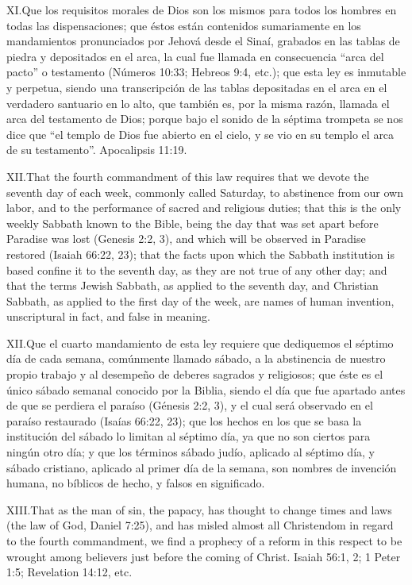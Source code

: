 \lettrine{XI.} Que los requisitos morales de Dios son los mismos para todos los hombres en todas las dispensaciones; que éstos están contenidos sumariamente en los mandamientos pronunciados por Jehová desde el Sinaí, grabados en las tablas de piedra y depositados en el arca, la cual fue llamada en consecuencia “arca del pacto” o testamento (Números 10:33; Hebreos 9:4, etc.); que esta ley es inmutable y perpetua, siendo una transcripción de las tablas depositadas en el arca en el verdadero santuario en lo alto, que también es, por la misma razón, llamada el arca del testamento de Dios; porque bajo el sonido de la séptima trompeta se nos dice que “el templo de Dios fue abierto en el cielo, y se vio en su templo el arca de su testamento”. Apocalipsis 11:19.


\lettrine{XII.} That the fourth commandment of this law requires that we devote the seventh day of each week, commonly called Saturday, to abstinence from our own labor, and to the performance of sacred and religious duties; that this is the only weekly Sabbath known to the Bible, being the day that was set apart before Paradise was lost (Genesis 2:2, 3), and which will be observed in Paradise restored (Isaiah 66:22, 23); that the facts upon which the Sabbath institution is based confine it to the seventh day, as they are not true of any other day; and that the terms Jewish Sabbath, as applied to the seventh day, and Christian Sabbath, as applied to the first day of the week, are names of human invention, unscriptural in fact, and false in meaning.


\lettrine{XII.} Que el cuarto mandamiento de esta ley requiere que dediquemos el séptimo día de cada semana, comúnmente llamado sábado, a la abstinencia de nuestro propio trabajo y al desempeño de deberes sagrados y religiosos; que éste es el único sábado semanal conocido por la Biblia, siendo el día que fue apartado antes de que se perdiera el paraíso (Génesis 2:2, 3), y el cual será observado en el paraíso restaurado (Isaías 66:22, 23); que los hechos en los que se basa la institución del sábado lo limitan al séptimo día, ya que no son ciertos para ningún otro día; y que los términos sábado judío, aplicado al séptimo día, y sábado cristiano, aplicado al primer día de la semana, son nombres de invención humana, no bíblicos de hecho, y falsos en significado.


\lettrine{XIII.} That as the man of sin, the papacy, has thought to change times and laws (the law of God, Daniel 7:25), and has misled almost all Christendom in regard to the fourth commandment, we find a prophecy of a reform in this respect to be wrought among believers just before the coming of Christ. Isaiah 56:1, 2; 1 Peter 1:5; Revelation 14:12, etc.


